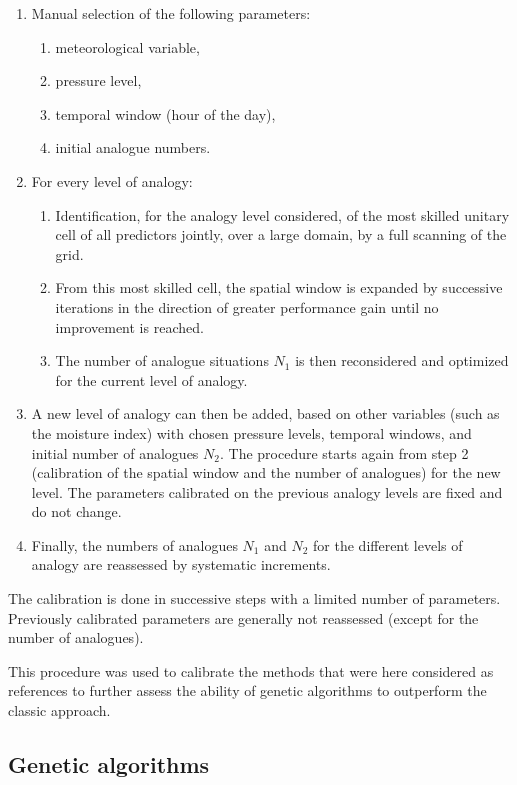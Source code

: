 \documentclass[review]{elsarticle}
\begin{document}
\begin{enumerate}
	\item Manual selection of the following parameters:
	\begin{enumerate}
		\item meteorological variable,
		\item pressure level,
		\item temporal window (hour of the day),
		\item initial analogue numbers.
	\end{enumerate}
	
	\item For every level of analogy:
	\begin{enumerate}
		\item Identification, for the analogy level considered, of the most skilled unitary cell of all predictors jointly, over a large domain, by a full scanning of the grid.
		\item From this most skilled cell, the spatial window is expanded by successive iterations in the direction of greater performance gain until no improvement is reached.
		\item The number of analogue situations $N_{1}$ is then reconsidered and optimized for the current level of analogy.
	\end{enumerate}
	\item A new level of analogy can then be added, based on other variables (such as the moisture index) with chosen pressure levels, temporal windows, and initial number of analogues $N_{2}$. The procedure starts again from step 2 (calibration of the spatial window and the number of analogues) for the new level. The parameters calibrated on the previous analogy levels are fixed and do not change. 
	\item Finally, the numbers of analogues $N_{1}$ and $N_{2}$ for the different levels of analogy are reassessed by systematic increments.
\end{enumerate}

The calibration is done in successive steps with a limited number of parameters. Previously calibrated parameters are generally not reassessed (except for the number of analogues).

This procedure was used to calibrate the methods that were here considered as references to further assess the ability of genetic algorithms to outperform the classic approach.


\subsection{Genetic algorithms}
\label{sec:gas}
\end{document}
